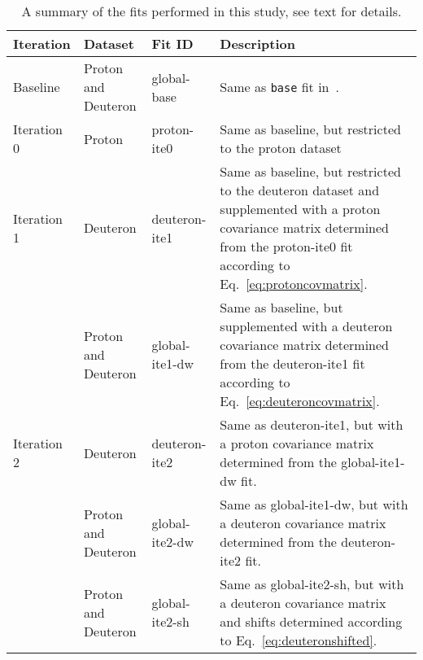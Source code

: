 \begin{table}[h]
  \centering
  \scriptsize
  \renewcommand{\arraystretch}{1.13}
  \begin{tabularx}{\textwidth}{lllX}
    \toprule
    \rowcolor{blue!40}
    {\bf Iteration }  & {\bf Dataset }            & {\bf Fit ID }        & { \bf Description }\\
    \midrule
    Baseline    & Proton and Deuteron & global-base    & Same as {\tt base} fit in~\cite{Faura:2020oom}.\\
    \midrule
    Iteration 0 & Proton              & proton-ite0    & Same as baseline, but restricted to the proton dataset\\
    \midrule
    Iteration 1 & Deuteron            & deuteron-ite1  & Same as baseline, but restricted to the deuteron dataset
                                                         and supplemented with a proton covariance matrix determined
                                                         from the proton-ite0 fit according to
                                                         Eq.~\eqref{eq:protoncovmatrix}.\\
                & Proton and Deuteron & global-ite1-dw & Same as baseline, but supplemented with a deuteron covariance
                                                         matrix determined from the deuteron-ite1 fit according to
                                                         Eq.~\eqref{eq:deuteroncovmatrix}.\\
    \midrule
    Iteration 2 & Deuteron            & deuteron-ite2  & Same as deuteron-ite1, but with a proton covariance matrix
                                                         determined from the global-ite1-dw fit.\\
                & Proton and Deuteron & global-ite2-dw & Same as global-ite1-dw, but with a deuteron covariance matrix
                                                         determined from the deuteron-ite2 fit.\\
                & Proton and Deuteron & global-ite2-sh & Same as global-ite2-sh, but with a deuteron covariance matrix
                                                         and shifts determined according to
                                                         Eq.~\eqref{eq:deuteronshifted}.\\
    \bottomrule
  \end{tabularx}
  \caption{A summary of the fits performed in this study, see text for details.}
  \label{tab:fits}
\end{table}
